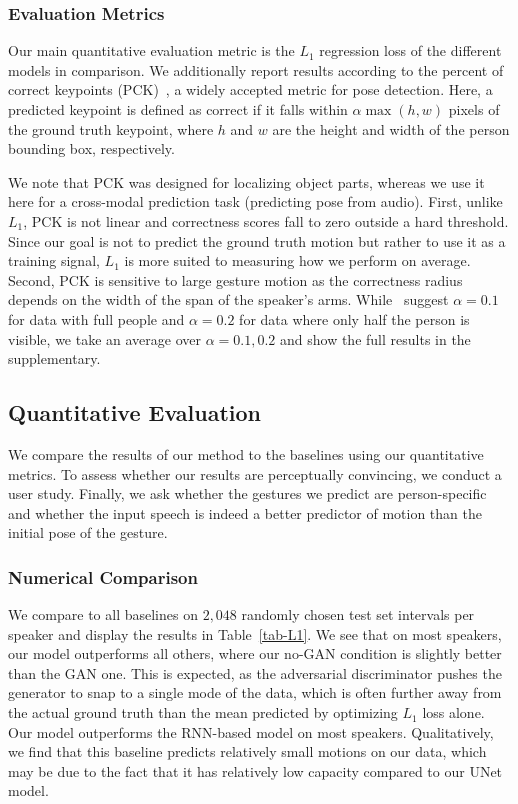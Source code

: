 \documentclass[10pt,twocolumn,letterpaper]{article}
\newcommand{\unet}{UNet}
\begin{document}
\subsubsection{Evaluation Metrics}
Our main quantitative evaluation metric is the $L_1$ regression loss of the different models in comparison. We additionally report results according to the percent of correct keypoints (PCK)~\cite{pck}, a widely accepted metric for pose detection. Here, a predicted keypoint is defined as correct if it falls within $\alpha \max(h,w)$ pixels of the ground truth keypoint, where $h$ and $w$ are the height and width of the person bounding box, respectively.

We note that PCK was designed for localizing object parts, whereas we use it here for a cross-modal prediction task (predicting pose from audio). First, unlike $L_1$, PCK is not linear and correctness scores fall to zero outside a hard threshold. Since our goal is not to predict the ground truth motion but rather to use it as a training signal, $L_1$ is more suited to measuring how we perform on average. Second, PCK is sensitive to large gesture motion as the correctness radius depends on the width of the span of the speaker's arms. While~\cite{pck} suggest $\alpha=0.1$ for data with full people and $\alpha=0.2$ for data where only half the person is visible, we take an average over $\alpha=0.1,0.2$ and show the full results in the supplementary.

\subsection{Quantitative Evaluation}
We compare the results of our method to the baselines using our quantitative metrics. To assess whether our results are perceptually convincing, we conduct a user study. Finally, we ask whether the gestures we predict are person-specific and whether the input speech is indeed a better predictor of motion than the initial pose of the gesture.

\subsubsection{Numerical Comparison} We compare to all baselines on $2{,}048$ randomly chosen test set intervals per speaker and display the results in Table~\ref{tab-L1}. We see that on most speakers, our model outperforms all others, where our no-GAN condition is slightly better than the GAN one. This is expected, as the adversarial discriminator pushes the generator to snap to a single mode of the data, which is often further away from the actual ground truth than the mean predicted by optimizing $L_1$ loss alone.
Our model outperforms the RNN-based model on most speakers. Qualitatively, we find that this baseline predicts relatively small motions on our data, which may be due to the fact that it has relatively low capacity compared to our \unet{} model.
\end{document}
